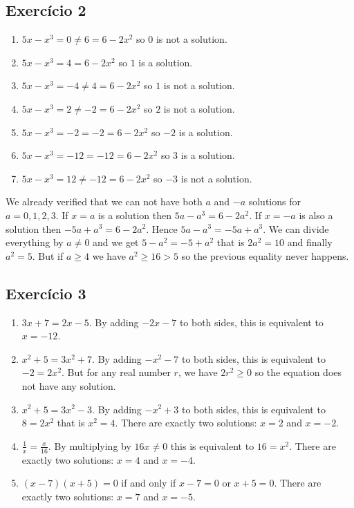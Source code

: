 \subsection*{Exercício 2}

\begin{enumerate}
\item $5x - x^3 = 0 \neq 6 = 6 - 2x^2$ so $0$ is not a solution.
\item $5x - x^3 = 4 = 6 - 2x^2$ so $1$ is a solution.
\item $5x - x^3 = -4 \neq 4 = 6 - 2x^2$ so $1$ is not a solution.
\item $5x - x^3 = 2 \neq -2 = 6 - 2x^2$ so $2$ is not a solution.
\item $5x - x^3 = -2 = -2 = 6 - 2x^2$ so $-2$ is a solution.
\item $5x - x^3 = -12 = -12 = 6 - 2x^2$ so $3$ is a solution.
\item $5x - x^3 = 12 \neq -12 = 6 - 2x^2$ so $-3$ is not a solution.
\end{enumerate}

We already verified that we can not have both $a$ and $-a$ solutions for
$a = 0,1,2,3$. If $x=a$ is a solution then $5a - a^3 = 6 - 2a^2$.
If $x=-a$ is also a solution then $-5a + a^3 = 6 - 2a^2$.
Hence $5a - a^3 = -5a + a^3$. We can divide everything by $a \neq 0$ and we
get $5 - a^2 = -5 + a^2$ that is $2a^2 = 10$ and finally $a^2 = 5$. But
if $a \geq 4$ we have $a^2 \geq 16 > 5$ so the previous equality never happens.

\subsection*{Exercício 3}

\begin{enumerate}
\item $3x + 7 = 2x - 5$. By adding $-2x-7$ to both sides, this is equivalent
  to $x = -12$.
\item $x^2 + 5 = 3x^2 + 7$. By adding $-x^2 - 7$ to both sides, 
  this is equivalent to $-2 = 2x^2$. But for any real number $r$, we
  have $2r^2 \geq 0$ so the equation does not have any solution.
\item $x^2 + 5 = 3x^2 - 3$. By adding $-x^2 + 3$ to both sides,
  this is equivalent to $8 = 2x^2$ that is $x^2 = 4$. There are exactly
  two solutions: $x = 2$ and $x = -2$.
\item $\frac{1}{x} = \frac{x}{16}$. By multiplying by $16x \neq 0$ this is
  equivalent to $16 = x^2$. There are exactly two solutions:
  $x = 4$ and $x=-4$.
\item $\left(x - 7\right)\left(x + 5\right) = 0$ if and only if
  $x - 7 = 0$ or $x+5=0$. There are  exactly two solutions:
  $x = 7$ and $x=-5$.
\end{enumerate}

